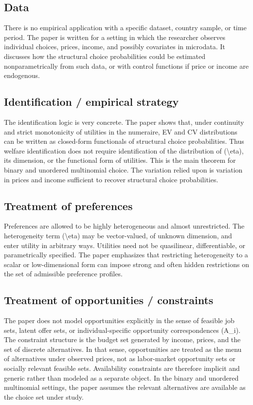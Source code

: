 \documentclass[11pt,a4paper]{article}
\begin{document}
\subsection*{Data}
There is no empirical application with a specific dataset, country sample, or time period. The paper is written for a setting in which the researcher observes individual choices, prices, income, and possibly covariates in microdata. It discusses how the structural choice probabilities could be estimated nonparametrically from such data, or with control functions if price or income are endogenous.

\subsection*{Identification / empirical strategy}
The identification logic is very concrete. The paper shows that, under continuity and strict monotonicity of utilities in the numeraire, EV and CV distributions can be written as closed-form functionals of structural choice probabilities. Thus welfare identification does not require identification of the distribution of (\textbackslash{}eta), its dimension, or the functional form of utilities. This is the main theorem for binary and unordered multinomial choice. The variation relied upon is variation in prices and income sufficient to recover structural choice probabilities.

\subsection*{Treatment of preferences}
Preferences are allowed to be highly heterogeneous and almost unrestricted. The heterogeneity term (\textbackslash{}eta) may be vector-valued, of unknown dimension, and enter utility in arbitrary ways. Utilities need not be quasilinear, differentiable, or parametrically specified. The paper emphasizes that restricting heterogeneity to a scalar or low-dimensional form can impose strong and often hidden restrictions on the set of admissible preference profiles.

\subsection*{Treatment of opportunities / constraints}
The paper does not model opportunities explicitly in the sense of feasible job sets, latent offer sets, or individual-specific opportunity correspondences (A\_i). The constraint structure is the budget set generated by income, prices, and the set of discrete alternatives. In that sense, opportunities are treated as the menu of alternatives under observed prices, not as labor-market opportunity sets or socially relevant feasible sets. Availability constraints are therefore implicit and generic rather than modeled as a separate object. In the binary and unordered multinomial settings, the paper assumes the relevant alternatives are available as the choice set under study.
\end{document}
